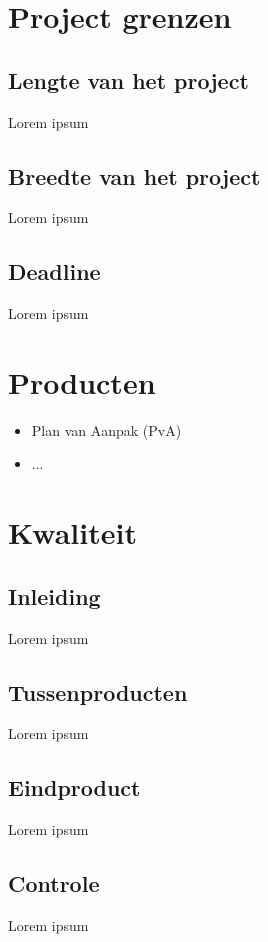 \documentclass[]{report}
\begin{document}
\chapter{Project grenzen}

\section{Lengte van het project}
Lorem ipsum

\section{Breedte van het project}
Lorem ipsum

\section{Deadline}
Lorem ipsum





\chapter{Producten}

\begin{itemize}
	\item Plan van Aanpak (PvA)
	\item ...
		\newline
\end{itemize} 





\chapter{Kwaliteit}

\section{Inleiding}
Lorem ipsum

\section{Tussenproducten}
Lorem ipsum

\section{Eindproduct}	
Lorem ipsum

\section{Controle}	
Lorem ipsum
\end{document}
